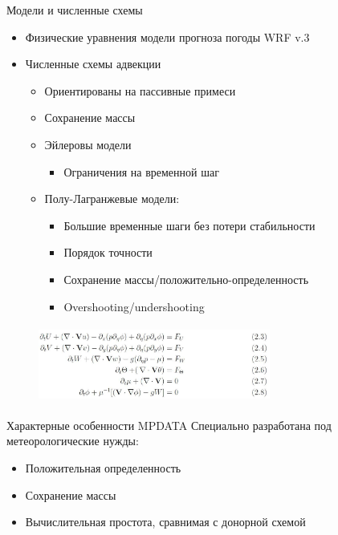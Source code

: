 \begin{frame}{Модели и численные схемы}
\begin{itemize}
  \item Физические уравнения модели прогноза погоды WRF v.3 \cite{wrf:arw}
  \item Численные схемы адвекции
\begin{itemize}
  \item Ориентированы на пассивные примеси
  \item Сохранение массы
  \item Эйлеровы модели
    \begin{itemize}
    \item Ограничения на временной шаг
    \end{itemize}
  \item Полу-Лагранжевые модели:
    \begin{itemize}
    \item Большие временные шаги без потери стабильности
    \item Порядок точности
    \item Сохранение массы/положительно-определенность
    \item Overshooting/undershooting
  \end{itemize}
\end{itemize}

\end{itemize}



\begin{figure}
\centering
\includegraphics[height=1in, width=3in]{artwork/images/wrf_governing_equations}
\label{fig:wrf-equations}
\end{figure}

\end{frame}



\begin{frame}{Характерные особенности MPDATA}
Специально разработана под метеорологические нужды:
\begin{itemize}
  \item Положительная определенность
  \item Сохранение массы
  \item Вычислительная простота, сравнимая с донорной схемой
\end{itemize}
\end{frame}


